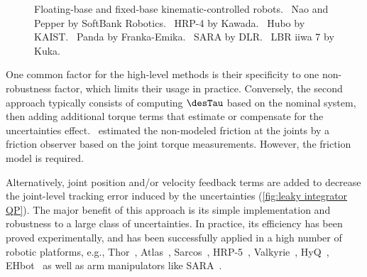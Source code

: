 \begin{figure}
	\centering			
	\hfil 
	\caption{Floating-base and fixed-base kinematic-controlled robots.~ Nao and~ Pepper by SoftBank Robotics.~ HRP-4 by Kawada.~ Hubo by KAIST.~ Panda by Franka-Emika.~ SARA by DLR.~ LBR iiwa 7 by Kuka.}
	\label{fig:robots}
\end{figure}

One common factor for the high-level methods is their specificity to one non-robustness factor, which limits their usage in practice.
Conversely, the second approach typically consists of computing $\desTau$ based on the nominal system, then adding additional torque terms that estimate or compensate for the uncertainties effect.~\cite{letien2008iros} estimated the non-modeled friction at the joints by a friction observer based on the joint torque measurements. However, the friction model is required.

Alternatively, joint position and/or velocity feedback terms are added to decrease the joint-level tracking error induced by the uncertainties (\cref{fig:leaky integrator QP}). The major benefit of this approach is its simple implementation and robustness to a large class of uncertainties. In practice, its efficiency has been proved experimentally, and has been successfully applied in a high number of robotic platforms, e.g., Thor~\cite{hopkins2015icra}, Atlas~\cite{johnson2015journalOfFieldRobotics,feng2014humanoids,kuindersma2016autonomousRobot,koolen2016ijhr}, Sarcos~\cite{mistry2010icra}, HRP-5~\cite{cisneros2018iros}, Valkyrie~\cite{paine2015journalOfFieldRobotics},  HyQ~\cite{focchi2016controlTheoryandTechnology}, EHbot~\cite{shi2022machines} as well as arm manipulators like SARA~\cite{iskandar2020iros}. 


